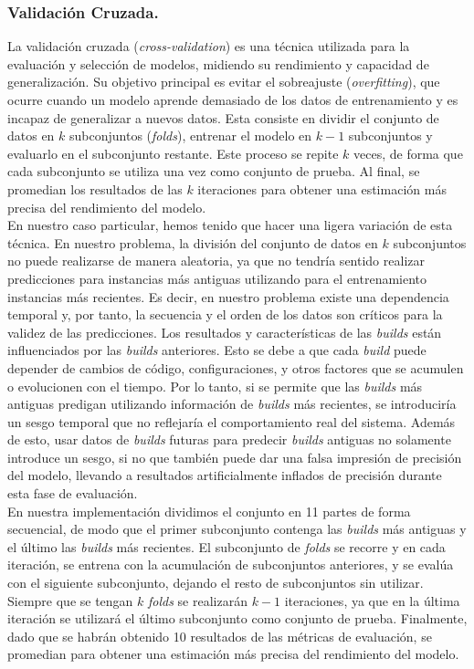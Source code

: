 \subsubsection{Validación Cruzada.}
La validación cruzada (\textit{cross-validation}) es una técnica utilizada para la evaluación y
selección de modelos, midiendo su rendimiento y capacidad de generalización. Su objetivo
principal es evitar el sobreajuste (\textit{overfitting}), que ocurre cuando un modelo
aprende demasiado de los datos de entrenamiento y es incapaz de generalizar a nuevos datos. Esta
consiste en dividir el conjunto de datos en $k$ subconjuntos (\textit{folds}), entrenar el modelo
en $k-1$ subconjuntos y evaluarlo en el subconjunto restante. Este proceso se repite $k$ veces,
de forma que cada subconjunto se utiliza una vez como conjunto de prueba. Al final, se promedian
los resultados de las $k$ iteraciones para obtener una estimación más precisa del rendimiento del
modelo.\\

En nuestro caso particular, hemos tenido que hacer una ligera variación de esta técnica. En
nuestro problema, la división del conjunto de datos en $k$ subconjuntos no puede realizarse de
manera aleatoria, ya que no tendría sentido realizar predicciones para instancias más antiguas
utilizando para el entrenamiento instancias más recientes. Es decir, en nuestro problema existe
una dependencia temporal y, por tanto, la secuencia y el orden de los datos son críticos para la
validez de las predicciones. Los resultados y características de las \textit{builds} están
influenciados por las \textit{builds} anteriores. Esto se debe a que cada \textit{build} puede
depender de cambios de código, configuraciones, y otros factores que se acumulen o evolucionen
con el tiempo. Por lo tanto, si se permite que las \textit{builds} más antiguas predigan utilizando
información de \textit{builds} más recientes, se introduciría un sesgo temporal que no reflejaría
el comportamiento real del sistema. Además de esto, usar datos de \textit{builds} futuras para
predecir \textit{builds} antiguas no solamente introduce un sesgo, si no que también puede dar
una falsa impresión de precisión del modelo, llevando a resultados artificialmente inflados de
precisión durante esta fase de evaluación.\\

En nuestra implementación dividimos el conjunto en 11 partes de forma secuencial, de modo que el
primer subconjunto contenga las \textit{builds} más antiguas y el último las \textit{builds} más
recientes. El subconjunto de \textit{folds} se recorre y en cada iteración, se entrena con la
acumulación de subconjuntos anteriores, y se evalúa con el siguiente subconjunto, dejando el resto
de subconjuntos sin utilizar. Siempre que se tengan $k$ \textit{folds} se realizarán $k-1$
iteraciones, ya que en la última iteración se utilizará el último subconjunto como conjunto de
prueba. Finalmente, dado que se habrán obtenido 10 resultados de las métricas de evaluación, se
promedian para obtener una estimación más precisa del rendimiento del modelo.\\

